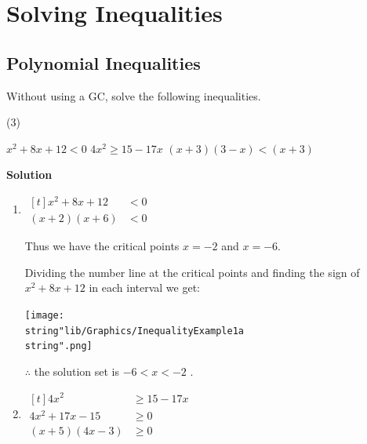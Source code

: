 \documentclass[11pt,a4paper]{book}
\begin{document}
\newpage

\section{Solving Inequalities}

\subsection{Polynomial Inequalities}

\begin{example}

Without using a GC, solve the following inequalities.

\begin{tasks}[label=(\alph*),label-width=3.5ex](3)

\task $x^{2}+8x+12<0$
\task $4x^{2}\geq15-17x$
\task $\left(x+3\right)\left(3-x\right)<\left(x+3\right)$

\end{tasks}

\textbf{Solution}

\begin{enumerate}[label=(\alph*)]

\item

$
\begin{aligned}[t]
x^{2}+8x+12 & <0\\
\left(x+2\right)\left(x+6\right) & <0
\end{aligned}
$

Thus we have the critical points $x=-2$ and $x=-6$.

Dividing the number line at the critical points and finding the sign
of $x^{2}+8x+12$ in each interval we get:
\begin{center}
\texttt{[image: \\string"lib/Graphics/InequalityExample1a\\string".png]}
\par\end{center}

$\therefore$ the solution set is $-6<x<-2$ .

\item
$
\begin{aligned}[t]
4x^{2} & \geq15-17x\\
4x^{2}+17x-15 & \geq0\\
\left(x+5\right)\left(4x-3\right) & \geq0
\end{aligned}
$


\end{enumerate}
\end{example}
\end{document}
